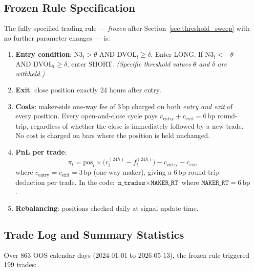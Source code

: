 \documentclass[12pt, a4paper]{article}
\theoremstyle{plain}
\theoremstyle{definition}
\newcommand{\bp}{\,\mathrm{bp}}
\begin{document}
\subsection{Frozen Rule Specification}

The fully specified trading rule --- \emph{frozen} after Section~\ref{sec:threshold_sweep}
with no further parameter changes --- is:

\begin{enumerate}
  \item \textbf{Entry condition}: N3$_t > \theta$ AND DVOL$_t \geq \delta$.
        Enter LONG. If N3$_t < -\theta$ AND DVOL$_t \geq \delta$, enter SHORT.
        \emph{(Specific threshold values $\theta$ and $\delta$ are withheld.)}
  \item \textbf{Exit}: close position exactly 24 hours after entry.
  \item \textbf{Costs}: maker-side one-way fee of $3\bp$ charged on both
        \emph{entry and exit} of every position.  Every open-and-close cycle
        pays $c_{\text{entry}} + c_{\text{exit}} = 6\bp$ round-trip,
        regardless of whether the close is immediately followed by a new trade.
        No cost is charged on bars where the position is held unchanged.
  \item \textbf{PnL per trade}:
        \[
          \pi_t = \text{pos}_t \times
                  \bigl(r_t^{(24h)} - f_t^{(24h)}\bigr)
                  - c_{\text{entry}} - c_{\text{exit}}
        \]
        where $c_{\text{entry}} = c_{\text{exit}} = 3\bp$ (one-way maker),
        giving a $6\bp$ round-trip deduction per trade.
        In the code: $\texttt{n\_trades} \times \texttt{MAKER\_RT}$
        where $\texttt{MAKER\_RT} = 6\bp$.
  \item \textbf{Rebalancing}: positions checked daily at signal update time.
\end{enumerate}

\subsection{Trade Log and Summary Statistics}

Over 863 OOS calendar days (2024-01-01 to 2026-05-13), the frozen rule
triggered 199 trades:
\end{document}
